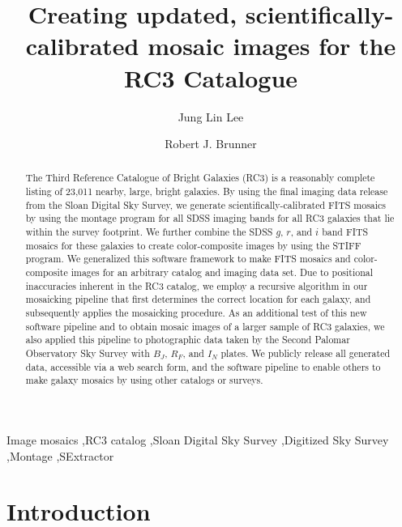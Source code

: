 \documentclass[authoryear, 12pt, 5p, times]{elsarticle}
\begin{document}
\begin{frontmatter}
\title{Creating updated, scientifically-calibrated mosaic images for the RC3 Catalogue}
\author[ucb]{Jung Lin Lee}
\author[ui]{Robert J. Brunner}
\address[ucb]{Astronomy Department, University of California at Berkeley, Berkeley, CA 94720-3411} 
\address[ui]{Department of Astronomy, University of Illinois, Urbana, IL 61801}

\begin{abstract}
The Third Reference Catalogue of Bright Galaxies (RC3) is a reasonably complete listing of 23,011 nearby, large, bright galaxies. By using the final imaging data release from the Sloan Digital Sky Survey, we generate scientifically-calibrated FITS mosaics by using the montage program for all SDSS imaging bands for all RC3 galaxies that lie within the survey footprint. We further combine the SDSS $g$, $r$, and $i$ band FITS mosaics for these galaxies to create color-composite images by using the STIFF program. We generalized this software framework to make FITS mosaics and color-composite images for an arbitrary catalog and imaging data set. Due to positional inaccuracies inherent in the RC3 catalog, we employ a recursive algorithm in our mosaicking pipeline that first determines the correct location for each galaxy, and subsequently applies the mosaicking procedure.
As an additional test of this new software pipeline and to obtain mosaic images of a larger sample of RC3 galaxies, we also applied this pipeline to  photographic data taken by the Second Palomar Observatory Sky Survey with $B_J$, $R_F$, and $I_N$ plates. We publicly release all generated data, accessible via a web search form, and the software pipeline to enable others to make  galaxy mosaics by using other catalogs or surveys.
\end{abstract}

\begin{keyword}
Image mosaics \sep RC3 catalog \sep Sloan Digital Sky Survey \sep Digitized Sky Survey \sep Montage \sep SExtractor
\end{keyword}

\end{frontmatter}

\section{Introduction}
\end{document}
